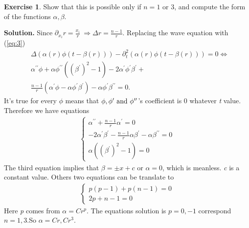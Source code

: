 \message{ !name(PDE-hw5-21935004-\unexpanded{谭焱}.tex)}\documentclass[a4paper]{book}
\newenvironment{solution}%
{\noindent\textbf{Solution.}}%
{\qedhere}
\numberwithin{equation}{chapter}
\theoremstyle{definition}
\newtheorem{exc}[exm]{Exercise}
\begin{document}
\begin{multicols}{2}
\begin{exc}
  Show that this is possible only if $n = 1$ or 3, and compute the form of the functions $\alpha , \beta$.
\end{exc}

\begin{solution}
  Since $\partial_{x_i} r = \frac{x_i}{r} \ \Longrightarrow \Delta r = \frac{n-1}{r}$. Replacing the wave equation with (\ref{eq:3})
  \begin{align*}
    &\Delta(\alpha(r) \phi (t - \beta(r))) - \partial_t^2(\alpha(r) \phi(t - \beta(r))) = 0 \Longleftrightarrow \\
    &\alpha^{\prime \prime} \phi + \alpha \phi^{\prime \prime} ({(\beta^\prime)}^2 - 1) - 2\alpha^\prime\phi^{\prime} \beta^\prime +\\ &\frac{n-1}{r}(\alpha^\prime \phi - \alpha \phi^\prime \beta^\prime) - \alpha \phi^\prime \beta^{\prime \prime} = 0.
  \end{align*}
  It's true for every $\phi$ means that $\phi, \phi^\prime \textmd{ and } \phi^{\prime \prime}$'s coefficient is 0 whatever \textit{t} value. Therefore we have equations
  \begin{align*}
    \begin{cases}
      \alpha^{\prime \prime} + \frac{n-1}{r} \alpha^\prime = 0 \\
      - 2\alpha^\prime \beta^\prime - \frac{n-1}{r} \alpha \beta^{\prime} - \alpha \beta^{\prime \prime} = 0 \\
      \alpha ({(\beta^\prime)}^2 - 1) = 0 
    \end{cases}
  \end{align*}
  The third equation implies that $\beta = \pm x + c$ or $\alpha = 0$, which is meanless. \textit{c} is a constant value. Others two equations can be translate to
  \begin{align*}
    \begin{cases}
      p(p-1) + p(n-1) = 0 \\
      2p + n-1 = 0
    \end{cases}
  \end{align*}
  Here \textit{p} comes from $\alpha = C r^p$. The equations solution is $p = 0, -1$ correspond $n = 1, 3$.So $\alpha = C r , C r^3$. 
\end{solution}


\end{multicols}
\end{document}
